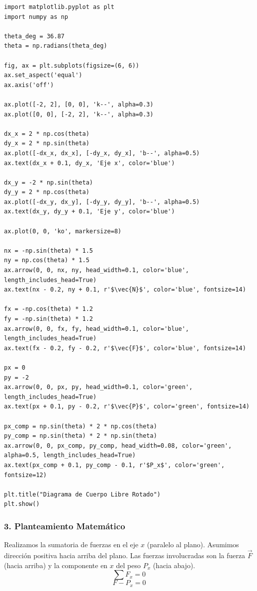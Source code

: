 \documentclass[12pt, a4paper]{article}
\begin{document}
\begin{lstlisting}
import matplotlib.pyplot as plt
import numpy as np

theta_deg = 36.87
theta = np.radians(theta_deg)

fig, ax = plt.subplots(figsize=(6, 6))
ax.set_aspect('equal')
ax.axis('off')

ax.plot([-2, 2], [0, 0], 'k--', alpha=0.3)
ax.plot([0, 0], [-2, 2], 'k--', alpha=0.3)

dx_x = 2 * np.cos(theta)
dy_x = 2 * np.sin(theta)
ax.plot([-dx_x, dx_x], [-dy_x, dy_x], 'b--', alpha=0.5)
ax.text(dx_x + 0.1, dy_x, 'Eje x', color='blue')

dx_y = -2 * np.sin(theta)
dy_y = 2 * np.cos(theta)
ax.plot([-dx_y, dx_y], [-dy_y, dy_y], 'b--', alpha=0.5)
ax.text(dx_y, dy_y + 0.1, 'Eje y', color='blue')

ax.plot(0, 0, 'ko', markersize=8)

nx = -np.sin(theta) * 1.5
ny = np.cos(theta) * 1.5
ax.arrow(0, 0, nx, ny, head_width=0.1, color='blue', length_includes_head=True)
ax.text(nx - 0.2, ny + 0.1, r'$\vec{N}$', color='blue', fontsize=14)

fx = -np.cos(theta) * 1.2
fy = -np.sin(theta) * 1.2
ax.arrow(0, 0, fx, fy, head_width=0.1, color='blue', length_includes_head=True)
ax.text(fx - 0.2, fy - 0.2, r'$\vec{F}$', color='blue', fontsize=14)

px = 0
py = -2
ax.arrow(0, 0, px, py, head_width=0.1, color='green', length_includes_head=True)
ax.text(px + 0.1, py - 0.2, r'$\vec{P}$', color='green', fontsize=14)

px_comp = np.sin(theta) * 2 * np.cos(theta)
py_comp = np.sin(theta) * 2 * np.sin(theta)
ax.arrow(0, 0, px_comp, py_comp, head_width=0.08, color='green', alpha=0.5, length_includes_head=True)
ax.text(px_comp + 0.1, py_comp - 0.1, r'$P_x$', color='green', fontsize=12)

plt.title("Diagrama de Cuerpo Libre Rotado")
plt.show()
\end{lstlisting}

\subsubsection*{3. Planteamiento Matemático}
Realizamos la sumatoria de fuerzas en el eje $x$ (paralelo al plano). Asumimos dirección positiva hacia arriba del plano. Las fuerzas involucradas son la fuerza $\vec{F}$ (hacia arriba) y la componente en $x$ del peso $P_x$ (hacia abajo).
$$ \sum F_x = 0 $$
$$ F - P_x = 0 $$
\end{document}
